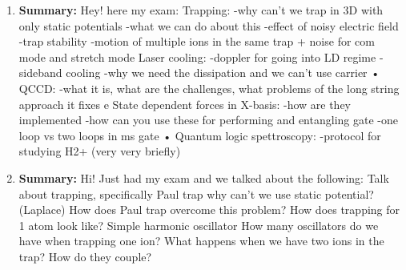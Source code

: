 \documentclass{article}%
\begin{document}
\begin{enumerate}%
\item%
\begin{mycolorbox}%
\textbf{Summary:}%
\newline%
Hey! here my exam:\newline%
 Trapping:\newline%
 {-}why can't we trap in 3D with only static potentials\newline%
 {-}what we can do about this\newline%
 {-}effect of noisy electric field\newline%
 {-}trap stability\newline%
 {-}motion of multiple ions in the same trap + noise for com mode and stretch mode\newline%
 Laser cooling:\newline%
 {-}doppler for going into LD regime\newline%
 {-}sideband cooling\newline%
 {-}why we need the dissipation and we can't use carrier\newline%
 • QCCD:\newline%
 {-}what it is, what are the challenges, what problems of the long string approach it fixes e State dependent forces in X{-}basis:\newline%
 {-}how are they implemented\newline%
 {-}how can you use these for performing and entangling gate\newline%
 {-}one loop vs two loops in ms gate\newline%
 • Quantum logic spettroscopy:\newline%
 {-}protocol for studying H2+ (very very briefly)%
\end{mycolorbox}%
\item%
\textbf{Summary:}%
\newline%
Hi! Just had my exam and we talked about the following:\newline%
 Talk about trapping, specifically Paul trap\newline%
 why can't we use static potential? (Laplace)\newline%
 How does Paul trap overcome this problem?\newline%
 How does trapping for 1 atom look like? Simple harmonic oscillator\newline%
 How many oscillators do we have when trapping one ion?\newline%
 What happens when we have two ions in the trap? How do they couple?\newline%

\end{enumerate}
\end{document}
